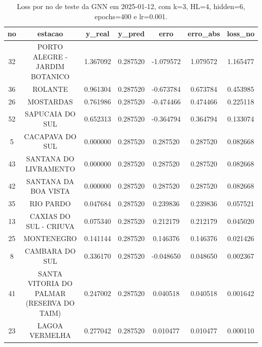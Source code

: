 \begin{table}[h]
\centering
\caption{Loss por no de teste da GNN em 2025-01-12, com k=3, HL=4, hidden=6, epochs=400 e lr=0.001.}
\label{tab:gnn_loss_k3_hl4_h6_e400_d20250112}
\begin{tabular}{ccccccc}
\toprule
no & estacao & y\_real & y\_pred & erro & erro\_abs & loss\_no \\
\midrule
32 & PORTO ALEGRE - JARDIM BOTANICO & 1.367092 & 0.287520 & -1.079572 & 1.079572 & 1.165477 \\
36 & ROLANTE & 0.961304 & 0.287520 & -0.673784 & 0.673784 & 0.453985 \\
26 & MOSTARDAS & 0.761986 & 0.287520 & -0.474466 & 0.474466 & 0.225118 \\
52 & SAPUCAIA DO SUL & 0.652313 & 0.287520 & -0.364794 & 0.364794 & 0.133074 \\
5 & CACAPAVA DO SUL & 0.000000 & 0.287520 & 0.287520 & 0.287520 & 0.082668 \\
43 & SANTANA DO LIVRAMENTO & 0.000000 & 0.287520 & 0.287520 & 0.287520 & 0.082668 \\
42 & SANTANA DA BOA VISTA & 0.000000 & 0.287520 & 0.287520 & 0.287520 & 0.082668 \\
35 & RIO PARDO & 0.047684 & 0.287520 & 0.239836 & 0.239836 & 0.057521 \\
13 & CAXIAS DO SUL - CRIUVA & 0.075340 & 0.287520 & 0.212179 & 0.212179 & 0.045020 \\
25 & MONTENEGRO & 0.141144 & 0.287520 & 0.146376 & 0.146376 & 0.021426 \\
8 & CAMBARA DO SUL & 0.336170 & 0.287520 & -0.048650 & 0.048650 & 0.002367 \\
41 & SANTA VITORIA DO PALMAR (RESERVA DO TAIM) & 0.247002 & 0.287520 & 0.040518 & 0.040518 & 0.001642 \\
23 & LAGOA VERMELHA & 0.277042 & 0.287520 & 0.010477 & 0.010477 & 0.000110 \\
\bottomrule
\end{tabular}
\end{table}
